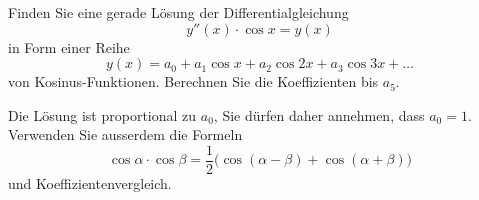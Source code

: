 Finden Sie eine gerade Lösung der Differentialgleichung 
\begin{equation}
y''(x)\cdot\cos x=y(x)
\label{aufgabe3-dgl}
\end{equation}
in Form einer Reihe
\begin{equation}
y(x)
=
a_0 + a_1\cos x + a_2 \cos 2x + a_3 \cos3x+\dots
\label{aufgabe3-ansatz}
\end{equation}
von Kosinus-Funktionen.
Berechnen Sie die Koeffizienten bis $a_5$.

\begin{hinweis}
Die Lösung ist proportional zu $a_0$, Sie dürfen daher annehmen, dass
$a_0=1$.
Verwenden Sie ausserdem die Formeln
\[
\cos\alpha \cdot \cos\beta
=
\frac12\bigl(\cos(\alpha-\beta) + \cos(\alpha+\beta)\bigr)
\]
und Koeffizientenvergleich.
\end{hinweis}

